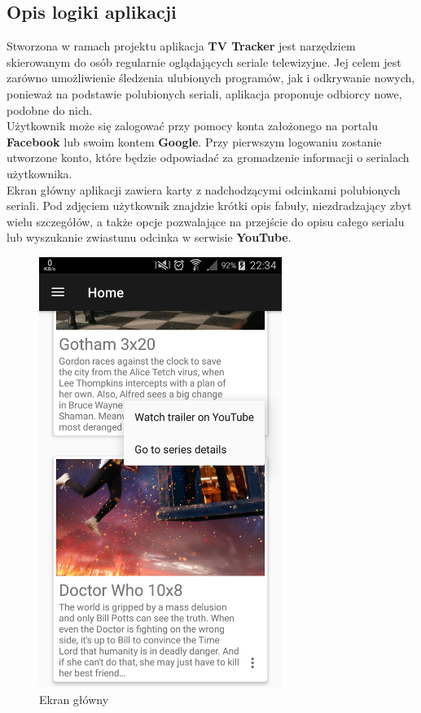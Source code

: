 \documentclass[10pt,a4paper]{article}
\begin{document}
\subsection{Opis logiki aplikacji}
Stworzona w ramach projektu aplikacja \textbf{TV Tracker} jest narzędziem skierowanym do osób regularnie oglądających seriale telewizyjne. Jej celem jest zarówno umożliwienie śledzenia ulubionych programów, jak i odkrywanie nowych, ponieważ na podstawie polubionych seriali, aplikacja proponuje odbiorcy nowe, podobne do nich.\\[\baselineskip]
Użytkownik może się zalogować przy pomocy konta założonego na portalu \textbf{Facebook} lub swoim kontem \textbf{Google}. Przy pierwszym logowaniu zostanie utworzone konto, które będzie odpowiadać za gromadzenie informacji o serialach użytkownika.\\[\baselineskip]
Ekran główny aplikacji zawiera karty z nadchodzącymi odcinkami polubionych seriali. Pod zdjęciem użytkownik znajdzie krótki opis fabuły, niezdradzający zbyt wielu szczegółów, a także opcje pozwalające na przejście do opisu całego serialu lub wyszukanie zwiastunu odcinka w serwisie \textbf{YouTube}.
\begin{figure}[H]
\centering
\includegraphics[height=14cm]{Resources/Images/home.png}
\caption{Ekran główny}
\end{figure}
\end{document}
